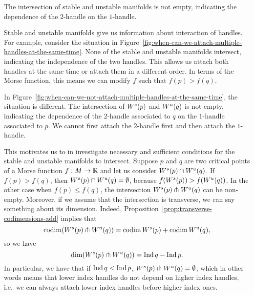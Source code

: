 \begin{marginfigure}
    \centering
    \caption{The intersection of stable and unstable manifolds is not empty, indicating the dependence of the $2$-handle on the $1$-handle.}
    \label{fig:when-can-we-not-attach-multiple-handles-at-the-same-time}
\end{marginfigure}
    Stable and unstable manifolds give us information about interaction of handles.
    For example, consider the situation in Figure~\ref{fig:when-can-we-attach-multiple-handles-at-the-same-time}.
    None of the stable and unstable manifolds intersect,
    indicating the independence of the two handles.
    This allows us attach both handles at the same time or attach them in a different order.
    In terms of the Morse function,
    this means we can modify $f$ such that  $f(p) > f(q)$.

    In Figure~\ref{fig:when-can-we-not-attach-multiple-handles-at-the-same-time}, the situation is different. The intersection of $W^s(p)$ and  $W^u(q)$ is not empty, indicating the dependence of the  $2$-handle associated to $q$ on the $1$-handle associated to $p$. We cannot first attach the $2$-handle first and then attach the $1$-handle.

    This motivates us to in investigate necessary and sufficient conditions for the stable and unstable manifolds to intersect.
    Suppose $p$ and $q$ are two critical points of a Morse function $f: M \to  \mathbb{R}$ and let us consider $W^s(p) \cap W^u(q)$.
    If $f(p) > f(q)$, then  $W^s(p) \cap W^u(q) = \emptyset$, because $f(W^s(p)) > f(W^u(q))$.
    In the other case when $f(p) \le  f(q)$, the intersection $W^s(p) \pitchfork W^u(q)$ can be non-empty.
    Moreover, if we assume that the intersection is transverse, we can say something about its dimension.
    Indeed, Proposition~\ref{prop:transverse-codimensions-add} implies that
    \[
        \operatorname{codim}(W^s(p) \pitchfork  W^u(q)) = \operatorname{codim} W^s(p) + \operatorname{codim} W^u(q)
    ,\] 
    so we have
    \[
        \dim(W^s(p) \pitchfork W^u(q)) = \operatorname{Ind} q - \operatorname{Ind} p
    .\]
    In particular, we have that if $\operatorname{Ind} q < \operatorname{Ind} p$,  $W^s(p) \pitchfork W^u(q) = \emptyset$, which in other words means that lower index handles do not depend on higher index handles, i.e.\ we can always attach lower index handles before higher index ones.


